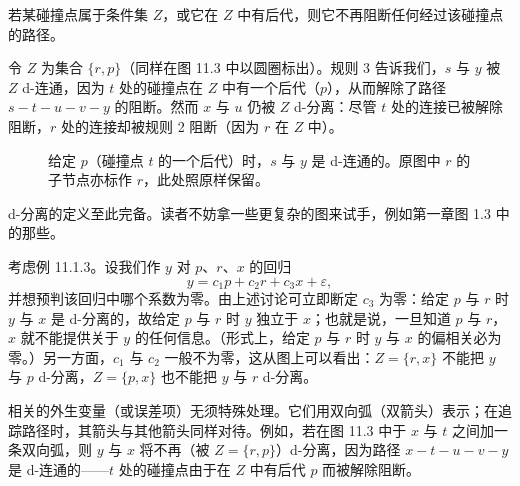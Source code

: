 若某碰撞点属于条件集 $Z$，或它在 $Z$ 中有后代，则它不再阻断任何经过该碰撞点的路径。

\begin{example}\label{ex:11.1.3}
令 $Z$ 为集合 $\{r,p\}$（同样在图 11.3 中以圆圈标出）。规则 3 告诉我们，$s$ 与 $y$ 被 $Z$ d-连通，因为 $t$ 处的碰撞点在 $Z$ 中有一个后代（$p$），从而解除了路径 $s-t-u-v-y$ 的阻断。然而 $x$ 与 $u$ 仍被 $Z$ d-分离：尽管 $t$ 处的连接已被解除阻断，$r$ 处的连接却被规则 2 阻断（因为 $r$ 在 $Z$ 中）。
\end{example}

\begin{figure}[htbp]
\centering
{}
\caption{给定 $p$（碰撞点 $t$ 的一个后代）时，$s$ 与 $y$ 是 d-连通的。原图中 $r$ 的子节点亦标作 $r$，此处照原样保留。}
\label{fig:11.3}
\end{figure}

d-分离的定义至此完备。读者不妨拿一些更复杂的图来试手，例如第一章图 1.3 中的那些。

考虑例 11.1.3。设我们作 $y$ 对 $p$、$r$、$x$ 的回归
\[
y=c_1p+c_2r+c_3x+\varepsilon,
\]
并想预判该回归中哪个系数为零。由上述讨论可立即断定 $c_3$ 为零：给定 $p$ 与 $r$ 时 $y$ 与 $x$ 是 d-分离的，故给定 $p$ 与 $r$ 时 $y$ 独立于 $x$；也就是说，一旦知道 $p$ 与 $r$，$x$ 就不能提供关于 $y$ 的任何信息。（形式上，给定 $p$ 与 $r$ 时 $y$ 与 $x$ 的偏相关必为零。）另一方面，$c_1$ 与 $c_2$ 一般不为零，这从图上可以看出：$Z=\{r,x\}$ 不能把 $y$ 与 $p$ d-分离，$Z=\{p,x\}$ 也不能把 $y$ 与 $r$ d-分离。

相关的外生变量（或误差项）无须特殊处理。它们用双向弧（双箭头）表示；在追踪路径时，其箭头与其他箭头同样对待。例如，若在图 11.3 中于 $x$ 与 $t$ 之间加一条双向弧，则 $y$ 与 $x$ 将不再（被 $Z=\{r,p\}$）d-分离，因为路径 $x-t-u-v-y$ 是 d-连通的——$t$ 处的碰撞点由于在 $Z$ 中有后代 $p$ 而被解除阻断。

